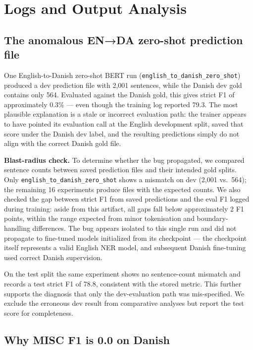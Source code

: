 \section{Logs and Output Analysis}
\label{sec:analysis}

\subsection{The anomalous EN→DA zero-shot prediction file}

One English-to-Danish zero-shot BERT run (\texttt{english\_to\_danish\_zero\_shot}) produced a dev prediction file with 2{,}001 sentences, while the Danish dev gold contains only 564. Evaluated against the Danish gold, this gives strict F1 of approximately 0.3\% — even though the training log reported 79.3. The most plausible explanation is a stale or incorrect evaluation path: the trainer appears to have pointed its evaluation call at the English development split, saved that score under the Danish dev label, and the resulting predictions simply do not align with the correct Danish gold file.

\textbf{Blast-radius check.} To determine whether the bug propagated, we compared sentence counts between saved prediction files and their intended gold splits. Only \texttt{english\_to\_danish\_zero\_shot} shows a mismatch on dev (2{,}001 vs.\ 564); the remaining 16 experiments produce files with the expected counts. We also checked the gap between strict F1 from saved predictions and the eval F1 logged during training: aside from this artifact, all gaps fall below approximately 2 F1 points, within the range expected from minor tokenisation and boundary-handling differences. The bug appears isolated to this single run and did not propagate to fine-tuned models initialized from its checkpoint — the checkpoint itself represents a valid English NER model, and subsequent Danish fine-tuning used correct Danish supervision.

On the test split the same experiment shows no sentence-count mismatch and records a test strict F1 of 78.8, consistent with the stored metric. This further supports the diagnosis that only the dev-evaluation path was mis-specified. We exclude the erroneous dev result from comparative analyses but report the test score for completeness.


\subsection{Why MISC F1 is 0.0 on Danish}

